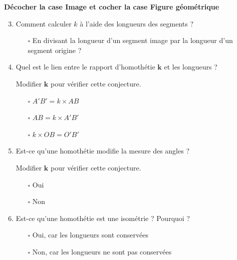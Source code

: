 \begin{activite}
    {\bfseries Décocher la case \og Image \fg et cocher la case \og Figure géométrique \fg}    
    \begin{enumerate}
        \setcounter{enumi}{2}
        \item Comment calculer $k$ à l'aide des longueurs des segments ?
        \begin{itemize}            
            \item[$\square$] En divisant la longueur d'un segment image par la longueur d'un segment origine ?
        \end{itemize}
        \item Quel est le lien entre le rapport d'homothétie $\mathbf{k}$ et les longueurs ?
        
        Modifier $\mathbf{k}$ pour vérifier cette conjecture.
        \begin{itemize}
            \item[$\square$] $A'B' = k\times AB$
            \item[$\square$] $AB = k\times A'B'$
            \item[$\square$] $k\times OB = O'B'$
        \end{itemize}
        \item Est-ce qu'une homothétie modifie la mesure des angles ?
        
        Modifier $\mathbf{k}$ pour vérifier cette conjecture.
        \begin{itemize}
            \item[$\square$] Oui
            \item[$\square$] Non            
        \end{itemize}
        \item Est-ce qu'une homothétie est une isométrie ? Pourquoi ?
        \begin{itemize}
            \item[$\square$] Oui, car les longueurs sont conservées
            \item[$\square$] Non,  car les longueurs ne sont pas conservées
        \end{itemize}
    \end{enumerate}
\end{activite}